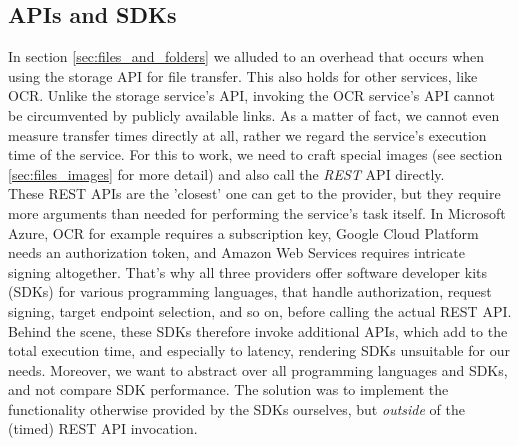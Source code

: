 \documentclass[a4paper,bibliography=totoc]{scrartcl}
\newcommand{\Azure}{Microsoft Azure\xspace}
\newcommand{\GCP}{Google Cloud Platform\xspace}
\newcommand{\AWS}{Amazon Web Services\xspace}
\begin{document}
\subsection{APIs and SDKs}
In section \ref{sec:files_and_folders} we alluded to an overhead that occurs when using the storage API for file transfer. This also holds for other services, like OCR. Unlike the storage service's API, invoking the OCR service's API cannot be circumvented by publicly available links. As a matter of fact, we cannot even measure transfer times directly at all, rather we regard the service's execution time of the service. For this to work, we need to craft special images (see section \ref{sec:files_images} for more detail) and also call the \textit{REST} API directly.\\
These REST APIs are the 'closest' one can get to the provider, but they require more arguments than needed for performing the service's task itself. In \Azure, OCR for example requires a subscription key,\cite{azure_ocr} \GCP needs an authorization token,\cite{gcp_annotate} and \AWS requires intricate signing altogether.\cite{aws_rekognition} That's why all three providers offer software developer kits (SDKs) for various programming languages, that handle authorization, request signing, target endpoint selection, and so on, before calling the actual REST API.\cite{aws_boto_client,azure_vision_sdk,gcp_annotate_sdk}\\
Behind the scene, these SDKs therefore invoke additional APIs, which add to the total execution time, and especially to latency, rendering SDKs unsuitable for our needs. Moreover, we want to abstract over all programming languages and SDKs, and not compare SDK performance. The solution was to implement the functionality otherwise provided by the SDKs ourselves, but \textit{outside} of the (timed) REST API invocation.
\end{document}
